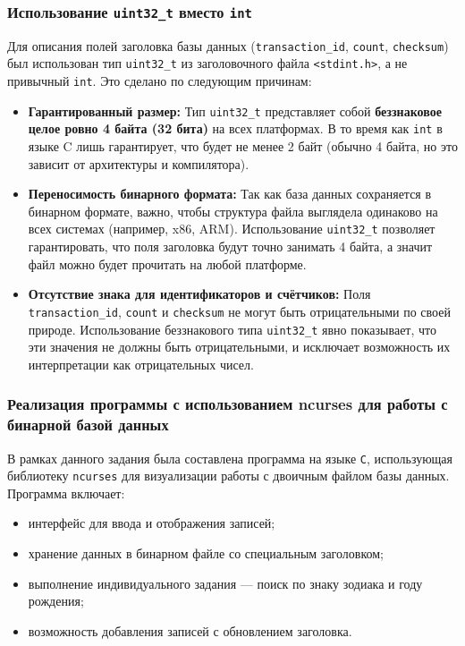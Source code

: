 \subsubsection*{Использование \texttt{uint32\_t} вместо \texttt{int}}

Для описания полей заголовка базы данных (\texttt{transaction\_id}, \texttt{count}, \texttt{checksum}) был использован тип \texttt{uint32\_t} из заголовочного файла \texttt{<stdint.h>}, а не привычный \texttt{int}. Это сделано по следующим причинам:

\begin{itemize}
  \item \textbf{Гарантированный размер:} 
  Тип \texttt{uint32\_t} представляет собой \textbf{беззнаковое целое ровно 4 байта (32 бита)} на всех платформах. В то время как \texttt{int} в языке C лишь гарантирует, что будет не менее 2 байт (обычно 4 байта, но это зависит от архитектуры и компилятора).

  \item \textbf{Переносимость бинарного формата:}
  Так как база данных сохраняется в бинарном формате, важно, чтобы структура файла выглядела одинаково на всех системах (например, x86, ARM). Использование \texttt{uint32\_t} позволяет гарантировать, что поля заголовка будут точно занимать 4 байта, а значит файл можно будет прочитать на любой платформе.

  \item \textbf{Отсутствие знака для идентификаторов и счётчиков:}
  Поля \texttt{transaction\_id}, \texttt{count} и \texttt{checksum} не могут быть отрицательными по своей природе. Использование беззнакового типа \texttt{uint32\_t} явно показывает, что эти значения не должны быть отрицательными, и исключает возможность их интерпретации как отрицательных чисел.
\end{itemize}

\subsubsection*{Реализация программы с использованием ncurses для работы с бинарной базой данных}

В рамках данного задания была составлена программа на языке \texttt{C}, использующая библиотеку \texttt{ncurses} для визуализации работы с двоичным файлом базы данных. Программа включает:

\begin{itemize}
    \item интерфейс для ввода и отображения записей;
    \item хранение данных в бинарном файле со специальным заголовком;
    \item выполнение индивидуального задания --- поиск по знаку зодиака и году рождения;
    \item возможность добавления записей с обновлением заголовка.
\end{itemize}

